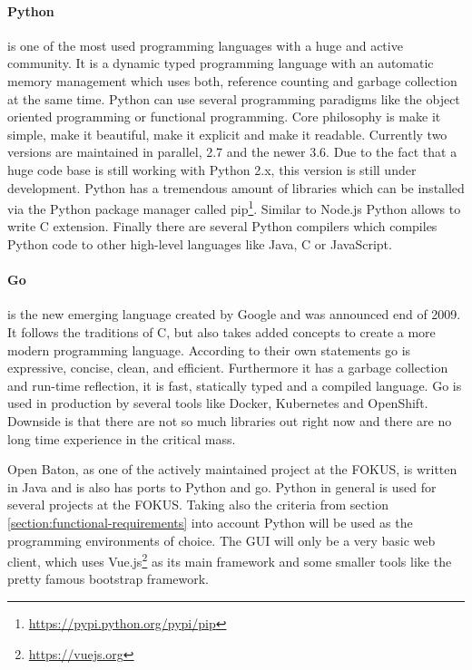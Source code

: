 \paragraph{Python} is one of the most used programming languages with a huge and active community.\autocite[cf.]{ProgramminLanguage:2017}
It is a dynamic typed programming language with an automatic memory management which uses both, reference counting and garbage collection at the same time.\autocite[cf.]{Python:GarbageCollection}
Python can use several programming paradigms like the object oriented programming or functional programming.
Core philosophy is make it simple, make it beautiful, make it explicit and make it readable.
Currently two versions are maintained in parallel, 2.7 and the newer 3.6.
Due to the fact that a huge code base is still working with Python 2.x, this version is still under development.\autocite[cf.]{Peterson:PythonReleaseSchedule}
Python has a tremendous amount of libraries which can be installed via the Python package manager called pip\footnote{\url{https://pypi.python.org/pypi/pip}}.
Similar to Node.js Python allows to write C extension.
Finally there are several Python compilers which compiles Python code to other high-level languages like Java, C or JavaScript.

\paragraph{Go} is the new emerging language created by Google and was announced end of 2009.
It follows the traditions of C, but also takes added concepts to create a more modern programming language.
According to their own statements go is expressive, concise, clean, and efficient.\autocite[cf.]{Go:Documentation}
Furthermore it has a garbage collection and run-time reflection, it is fast, statically typed and a compiled language.\autocite[cf.]{Go:Documentation}
Go is used in production by several tools like Docker, Kubernetes and OpenShift.
Downside is that there are not so much libraries out right now and there are no long time experience in the critical mass.

Open Baton, as one of the actively maintained project at the \ac{FOKUS}, is written in Java and is also has ports to Python and go.
Python in general is used for several projects at the \ac{FOKUS}.
Taking also the criteria from section \ref{section:functional-requirements} into account Python will be used as the  programming environments of choice.
The \ac{GUI} will only be a very basic web client, which uses Vue.js\footnote{\url{https://vuejs.org}} as its main framework and some smaller tools like the pretty famous bootstrap framework.


